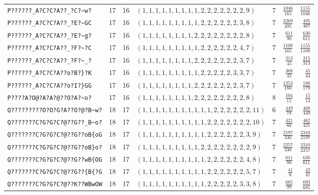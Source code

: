 \documentclass[paper=a4,fontsize=10.5pt,jafontsize=10.5pt]{jlreq}
\theoremstyle{plain}
\theoremstyle{definition}
\begin{document}
\begin{table}[htbp]
\begin{tabular}{llrlrrr}
\texttt{P??????\_A?C?C?A??\_?C?\textasciitilde{}w?} & 17 & 16 & $(1,1,1,1,1,1,1,1,1,2,2,2,2,2,2,2,9)$ & 7 & $\frac{1046}{165}$ & $\frac{1155}{1046}$ \\
\texttt{P??????\_A?C?C?A??\_?E?\textasciitilde{}GC} & 17 & 16 & $(1,1,1,1,1,1,1,1,1,2,2,2,2,2,2,3,8)$ & 7 & $\frac{3269}{495}$ & $\frac{495}{467}$ \\
\texttt{P??????\_A?C?C?A??\_?E?\textasciitilde{}g?} & 17 & 16 & $(1,1,1,1,1,1,1,1,2,2,2,2,2,2,2,2,8)$ & 7 & $\frac{611}{90}$ & $\frac{630}{611}$ \\
\texttt{P??????\_A?C?C?A??\_?F?\textasciitilde{}?C} & 17 & 16 & $(1,1,1,1,1,1,1,1,1,2,2,2,2,2,2,4,7)$ & 7 & $\frac{1108}{165}$ & $\frac{1155}{1108}$ \\
\texttt{P??????\_A?C?C?A??\_?F?\textasciitilde{}\_?} & 17 & 16 & $(1,1,1,1,1,1,1,1,2,2,2,2,2,2,2,3,7)$ & 7 & $\frac{313}{45}$ & $\frac{315}{313}$ \\
\texttt{P??????\_A?C?C?A??o?B?\}?K} & 17 & 16 & $(1,1,1,1,1,1,1,1,1,2,2,2,2,2,3,3,7)$ & 7 & $\frac{308}{45}$ & $\frac{45}{44}$ \\
\texttt{P??????\_A?C?C?A??o?I?\}GG} & 17 & 16 & $(1,1,1,1,1,1,1,1,2,2,2,2,2,2,2,3,7)$ & 7 & $\frac{1253}{180}$ & $\frac{180}{179}$ \\
\texttt{P????A?O@?A?A?@??O?A?\textasciitilde{}o?} & 17 & 16 & $(1,1,1,1,1,1,1,1,2,2,2,2,2,2,2,2,8)$ & 8 & $\frac{104}{15}$ & $\frac{15}{13}$ \\
\texttt{Q?????????O?O?G?A??O?@?B\textasciitilde{}w?} & 18 & 17 & $(1,1,1,1,1,1,1,1,1,1,1,2,2,2,2,2,2,11)$ & 6 & $\frac{449}{78}$ & $\frac{468}{449}$ \\
\texttt{Q???????C?G?G?C?@??G??\_B\textasciitilde{}o?} & 18 & 17 & $(1,1,1,1,1,1,1,1,1,1,2,2,2,2,2,2,2,10)$ & 7 & $\frac{421}{66}$ & $\frac{462}{421}$ \\
\texttt{Q???????C?G?G?C?@??G??oB\{oG} & 18 & 17 & $(1,1,1,1,1,1,1,1,1,1,2,2,2,2,2,2,3,9)$ & 7 & $\frac{2197}{330}$ & $\frac{2310}{2197}$ \\
\texttt{Q???????C?G?G?C?@??G??oB\}o?} & 18 & 17 & $(1,1,1,1,1,1,1,1,1,2,2,2,2,2,2,2,2,9)$ & 7 & $\frac{2257}{330}$ & $\frac{2310}{2257}$ \\
\texttt{Q???????C?G?G?C?@??G??wB\{OG} & 18 & 17 & $(1,1,1,1,1,1,1,1,1,1,2,2,2,2,2,2,4,8)$ & 7 & $\frac{611}{90}$ & $\frac{630}{611}$ \\
\texttt{Q???????C?G?G?C?@??G??\{B\{?G} & 18 & 17 & $(1,1,1,1,1,1,1,1,1,1,2,2,2,2,2,2,5,7)$ & 7 & $\frac{41}{6}$ & $\frac{42}{41}$ \\
\texttt{Q???????C?G?G?C?@??K??WBwOW} & 18 & 17 & $(1,1,1,1,1,1,1,1,1,1,2,2,2,2,2,3,3,8)$ & 7 & $\frac{685}{99}$ & $\frac{693}{685}$ \\

\end{tabular}
\end{table}
\end{document}
